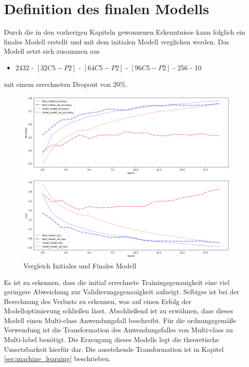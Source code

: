 \newpage

\section{Definition des finalen Modells}\label{sec:finalmodel}

Durch die in den vorherigen Kapiteln gewonnenen Erkenntnisse kann folglich ein finales Modell erstellt und mit dem initialen Modell verglichen werden. Das Modell setzt sich zusammen aus

\begin{itemize}
	\item 2432 - $[32C5-P2]$ - $[64C5-P2]$ - $[96C5-P2]$ - 256 - 10 
\end{itemize}

mit einem errechneten Dropout von 20\%.

\begin{figure}[htb]
	\centering
	\includegraphics[width=\textwidth]{images/comparison_initial_final}
	\caption{Vergleich Initiales und Finales Modell}
	\label{fig:comparison_initial_final}
\end{figure}

Es ist zu erkennen, dass die initial errechnete Trainingsgenauigkeit eine viel geringere Abweichung zur Validierungsgenauigkeit aufzeigt. Selbiges ist bei der Berechnung des Verlusts zu erkennen, was auf einen Erfolg der Modelloptimierung schließen lässt. 
Abschließend ist zu erwähnen, dass dieses Modell einen Multi-class Anwendungsfall beschreibt. Für die ordnungsgemäße Verwendung ist die Transformation des Anwendungsfalles von Multi-class zu Multi-label benötigt. Die Erzeugung dieses Modells legt die theoretische Umsetzbarkeit hierfür dar. Die ausstehende Transformation ist in Kapitel \ref{sec:machine_learning} beschrieben.

